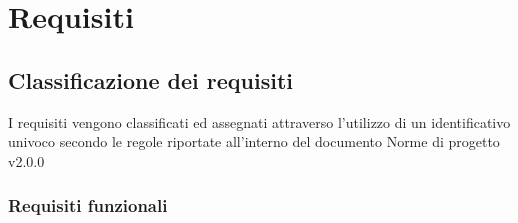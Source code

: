 \clearpage
{}

\section{Requisiti}
\label{sec:requisiti}
\subsection{Classificazione dei requisiti}
\label{sec:classificazione_requisiti}
I requisiti vengono classificati ed assegnati attraverso l'utilizzo di un identificativo univoco secondo le regole riportate all'interno del documento Norme di progetto v2.0.0
\subsubsection{Requisiti funzionali}

